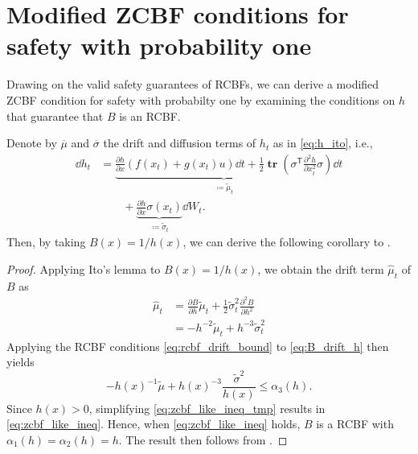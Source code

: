 \documentclass[twocolumn,amsthm]{autart}
\newcommand{\T}{^\mathsf{T}}
\DeclareMathOperator{\Tr}{\mathbf{tr}}
\DeclareMathOperator{\interior}{int}
\newcommand*{\XSet}{\mathcal{X}}
\newcommand*{\USet}{\mathcal{U}}
\begin{document}
\section{Modified ZCBF conditions for safety with probability one}
Drawing on the valid safety guarantees of RCBFs, we can derive a modified ZCBF condition for safety with probabilty one by examining the conditions on $h$ that guarantee that $B$ is an RCBF.

Denote by $\overline{\mu}$ and $\overline{\sigma}$ the drift and diffusion terms of $h_t$ as in \eqref{eq:h_ito}, i.e.,
\begin{equation} \label{eq:h_ito}
    \begin{split}
    \dd{h}_t &= \underbrace{\frac{\partial h}{\partial x} ( f(x_t) + g(x_t) u ) \dd{t} + \frac{1}{2} \Tr\left(\sigma\T \frac{\partial^2 h}{\partial x_t^2} \sigma\right)}_{\coloneqq \tilde{\mu}_t} \dd{t} \\
    &\qquad + \underbrace{\frac{\partial h}{\partial x} \sigma(x_t)}_{\coloneqq \tilde{\sigma}_t} \dd{W}_t.
    \end{split}
\end{equation}
Then, by taking $B(x) = 1/h(x)$, we can derive the following corollary to .
\begin{proof}
    Applying Ito's lemma to $B(x) = 1/h(x)$, we obtain the drift term $\hat{\mu}_t$ of $B$ as
    \begin{align}
        \hat{\mu}_t 
        &= \frac{\partial B}{\partial h} \tilde{\mu}_t + \frac{1}{2} \tilde{\sigma}_t^2 \frac{\partial^2 B}{\partial h^2} \\
        &= -h^{-2} \tilde{\mu}_t + h^{-3} \tilde{\sigma}_t^2 \label{eq:B_drift_h}
    \end{align}
    Applying the RCBF conditions \eqref{eq:rcbf_drift_bound} to \eqref{eq:B_drift_h} then yields
    \begin{equation} \label{eq:zcbf_like_ineq_tmp}
        -h(x)^{-1} \tilde{\mu} + h(x)^{-3} \frac{\tilde{\sigma}^2}{h(x)} \leq \alpha_3(h).
    \end{equation}
    Since $h(x) > 0$, simplifying \eqref{eq:zcbf_like_ineq_tmp} results in \eqref{eq:zcbf_like_ineq}.
    Hence, when \eqref{eq:zcbf_like_ineq} holds, $B$ is a RCBF with $\alpha_1(h) = \alpha_2(h) = h$. The result then follows from .
\end{proof}
\end{document}

